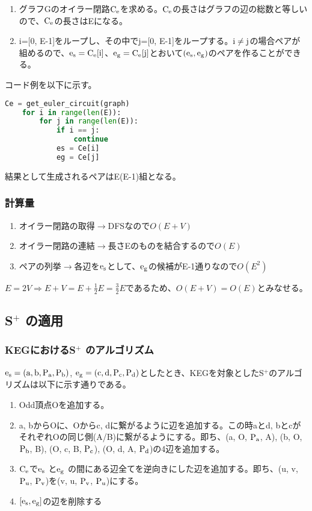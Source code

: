 \documentclass[11pt,a4j]{jarticle}
\newcommand{\splus}{S${}^\text{+}$}
\newcommand{\f}[1]{$\rm{#1}$} %
\newcommand{\ra }{$\rightarrow$}
\newcommand{\tops}[2]{\texorpdfstring{#1}{#2}} %
\begin{document}
\begin{enumerate}
    \item グラフGのオイラー閉路\f{C_e}を求める。\f{C_e}の長さはグラフの辺の総数と等しいので、\f{C_e}の長さはEになる。
    \item i=[0, E-1]をループし、その中でj=[0, E-1]をループする。\f{i\neq j}の場合ペアが組めるので、\f{e_s=C_e[i]}、\f{e_g=C_e[j]}とおいて\f{(e_s, e_g)}のペアを作ることができる。
\end{enumerate}

コード例を以下に示す。

\begin{center}
    \begin{lstlisting}[language=Python]
    Ce = get_euler_circuit(graph)
    for i in range(len(E)):
        for j in range(len(E)):
            if i == j:
                continue
            es = Ce[i]
            eg = Ce[j]
    \end{lstlisting}
\end{center}
結果として生成されるペアはE(E-1)組となる。

\subsubsection{計算量}
\begin{enumerate}
    \item オイラー閉路の取得\ra DFSなので$O(E+V)$
    \item オイラー閉路の連結\ra 長さEのものを結合するので$O(E)$
    \item ペアの列挙\ra 各辺を\f{e_s}として、\f{e_g}の候補がE-1通りなので$O(E^2)$
\end{enumerate}
$E=2V \Rightarrow E+V=E+\frac{1}{2}E=\frac{3}{2}E$であるため、$O(E+V)=O(E)$とみなせる。

\subsection{\tops{\splus}{S+} の適用}

\subsubsection{KEGにおける\tops{\splus}{S+} のアルゴリズム}
\f{e_s = (a, b, P_a, P_b)}, \f{e_g = (c, d, P_c, P_d)}としたとき、KEGを対象とした\splus のアルゴリズムは以下に示す通りである。
\begin{enumerate}
    \item Odd頂点Oを追加する。
    \item a, bからOに、Oからc, dに繋がるように辺を追加する。この時aとd, bとcがそれぞれOの同じ側(A/B)に繋がるようにする。即ち、(a, O, \f{P_a}, A), (b, O, \f{P_b}, B), (O, c, B, \f{P_c}), (O, d, A, \f{P_d})の4辺を追加する。
    \item \f{C_e}で\f{e_s} と\f{e_g} の間にある辺全てを逆向きにした辺を追加する。即ち、(u, v, \f{P_u}, \f{P_v})を(v, u, \f{P_v}, \f{P_u})にする。
    \item $[\rm{e_s}, \rm{e_g}]$の辺を削除する
\end{enumerate}
\end{document}
